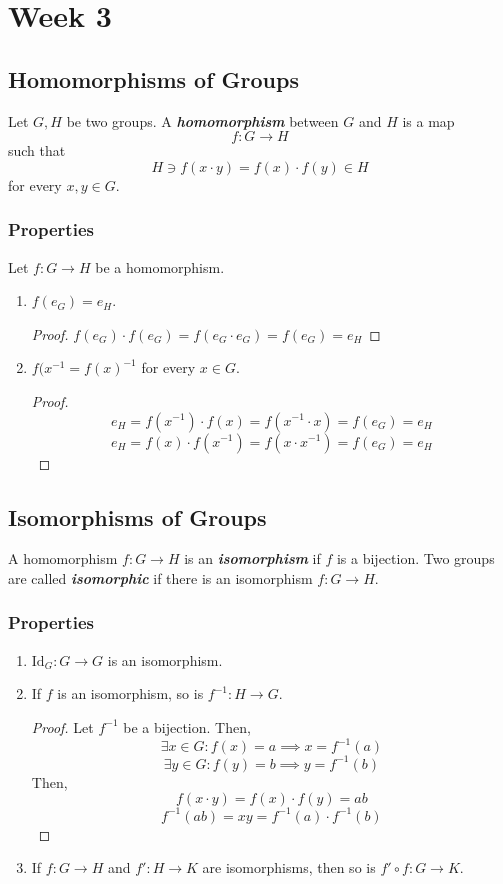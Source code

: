 \documentclass{report}
\newcommand{\textib}[1]{\textit{\textbf{{#1}}}}
\newcommand{\Id}{\text{Id}}
\begin{document}
\chapter{Week 3}
\section{Homomorphisms of Groups}
Let $G, H$ be two groups. A \textib{homomorphism} between $G$ and $H$ is a map 
\[f : G \to H\]
such that 
\[H \ni f(x \cdot y) = f(x) \cdot f(y) \in H\]
for every $x, y \in G$.


\subsection{Properties}
Let $f : G \to H$ be a homomorphism.
\begin{enumerate}[label=\textit{(\roman*)}]
    \item $f(e_G) = e_H$.
        \begin{proof}
            $f(e_G) \cdot f(e_G) = f(e_G \cdot e_G) = f(e_G) = e_H$
        \end{proof}
    \item $f(x^{-1} = f(x)^{-1}$ for every $x \in G$.
        \begin{proof}
            \[e_H = f(x^{-1}) \cdot f(x) = f(x^{-1} \cdot x) = f(e_G) = e_H\]
            \[e_H = f(x) \cdot f(x^{-1}) = f(x \cdot x^{-1}) = f(e_G) = e_H\]
        \end{proof}
\end{enumerate}





\section{Isomorphisms of Groups}
A homomorphism $f : G \to H$ is an \textib{isomorphism} if $f$ is a bijection. Two groups are called
\textib{isomorphic} if there is an isomorphism $f : G \to H$.


\subsection{Properties}
\begin{enumerate}[label=\textit{(\roman*)}]
    \item $\Id_G : G \to G$ is an isomorphism.
    \item If $f$ is an isomorphism, so is $f^{-1} : H \to G$.
        \begin{proof}
            Let $f^{-1}$ be a bijection. Then,
            \[\exists x \in G : f(x) = a \implies x = f^{-1}(a)\]
            \[\exists y \in G : f(y) = b \implies y = f^{-1}(b)\]
            Then,
            \[f(x \cdot y) = f(x) \cdot f(y) = ab\]
            \[f^{-1}(ab) = xy = f^{-1}(a) \cdot f^{-1}(b)\]
        \end{proof}
    \item If $f : G \to H$ and $f' : H \to K$ are isomorphisms, then so is $f' \circ f : G \to K$. 
\end{enumerate}
\end{document}
